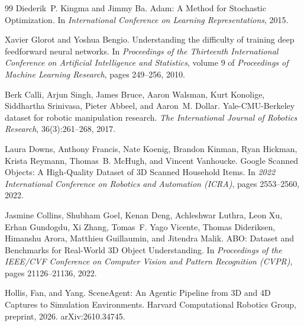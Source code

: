 \documentclass[10pt,letterpaper]{article}
\DeclareRobustCommand{\_}{\textunderscore\allowbreak}
\begin{document}
\begin{thebibliography}{99}
Diederik~P. Kingma and Jimmy Ba.
Adam: A Method for Stochastic Optimization.
In \textit{International Conference on Learning Representations}, 2015.

Xavier Glorot and Yoshua Bengio.
Understanding the difficulty of training deep feedforward neural networks.
In \textit{Proceedings of the Thirteenth International Conference on Artificial Intelligence and Statistics}, volume 9 of \textit{Proceedings of Machine Learning Research}, pages 249--256, 2010.

Berk Calli, Arjun Singh, James Bruce, Aaron Walsman, Kurt Konolige, Siddhartha Srinivasa, Pieter Abbeel, and Aaron~M. Dollar.
Yale-CMU-Berkeley dataset for robotic manipulation research.
\textit{The International Journal of Robotics Research}, 36(3):261--268, 2017.

Laura Downs, Anthony Francis, Nate Koenig, Brandon Kinman, Ryan Hickman, Krista Reymann, Thomas~B. McHugh, and Vincent Vanhoucke.
Google Scanned Objects: A High-Quality Dataset of 3D Scanned Household Items.
In \textit{2022 International Conference on Robotics and Automation (ICRA)}, pages 2553--2560, 2022.

Jasmine Collins, Shubham Goel, Kenan Deng, Achleshwar Luthra, Leon Xu, Erhan Gundogdu, Xi Zhang, Tomas~F. Yago Vicente, Thomas Dideriksen, Himanshu Arora, Matthieu Guillaumin, and Jitendra Malik.
ABO: Dataset and Benchmarks for Real-World 3D Object Understanding.
In \textit{Proceedings of the IEEE/CVF Conference on Computer Vision and Pattern Recognition (CVPR)}, pages 21126--21136, 2022.

Hollis, Fan, and Yang.
SceneAgent: An Agentic Pipeline from 3D and 4D Captures to Simulation Environments.
Harvard Computational Robotics Group, preprint, 2026.
arXiv:2610.34745.

\end{thebibliography}
\end{document}
